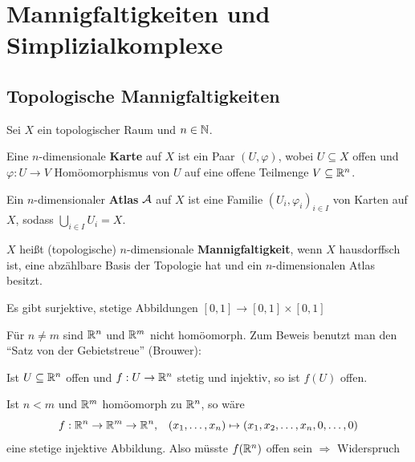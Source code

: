 \chapter{Mannigfaltigkeiten und Simplizialkomplexe}
\section{Topologische Mannigfaltigkeiten}
\begin{definition}%
    Sei $X$ ein topologischer Raum und $n \in \mathbb{N}$.
    \begin{defenum}
        \item Eine $n$-dimensionale \textbf{Karte} auf
              $X$ ist ein Paar $(U, \varphi)$, wobei $U \subseteq X$
              offen und $\varphi: U \rightarrow V$ Homöomorphismus
              von $U$ auf eine offene Teilmenge $V \subseteq \mathbb{R}^n$.
        \item Ein $n$-dimensionaler \textbf{Atlas} $\mathcal{A}$ auf $X$ ist eine
              Familie $(U_i, \varphi_i)_{i \in I}$ von Karten auf $X$,
              sodass $\bigcup_{i \in I} U_i = X$.
        \item $X$ heißt (topologische) $n$-dimensionale \textbf{Mannigfaltigkeit},
              wenn $X$ hausdorffsch ist, eine abzählbare Basis der 
              Topologie hat und ein $n$-dimensionalen Atlas besitzt.
    \end{defenum}
\end{definition}

\begin{bemerkung}
    \begin{bemenum}
        \item Es gibt surjektive, stetige Abbildungen $[0,1] \rightarrow [0,1] \times [0,1]$
        \item Für $n \neq m$ sind $\mathbb{R}^n$ und $\mathbb{R}^m$ nicht homöomorph.
              Zum Beweis benutzt man den \enquote{Satz von der Gebietstreue} (Brouwer):

              Ist $U \subseteq \mathbb{R}^n$ offen und $f: U \rightarrow \mathbb{R}^n$
              stetig und injektiv, so ist $f(U)$ offen.

              Ist $n < m$ und $\mathbb{R}^m$ homöomorph zu $\mathbb{R}^n$, so wäre
              \[f:\mathbb{R}^n \rightarrow \mathbb{R}^m \rightarrow \mathbb{R}^n, \;\;\; (x_1, \dots, x_n) \mapsto (x_1, x_2, \dots, x_n, 0, \dots, 0)\]
              eine stetige injektive Abbildung. Also müsste $f(\mathbb{R}^n)$
              offen sein $\Rightarrow$ Widerspruch
    \end{bemenum}
\end{bemerkung}

